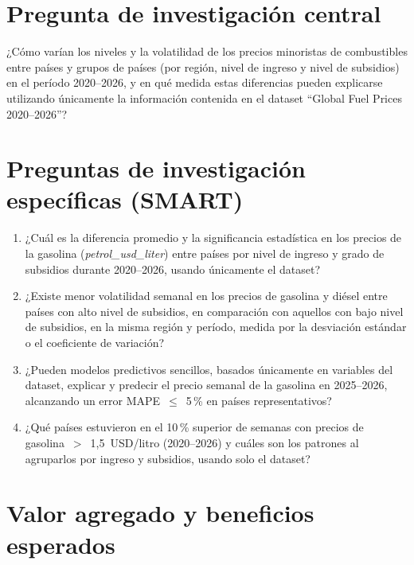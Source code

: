 \documentclass[stu, 12pt, a4paper, biblatex, donotrepeattitle]{apa7}
\begin{document}
\section{Pregunta de investigación central}

¿Cómo varían los niveles y la volatilidad de los precios minoristas de combustibles entre países y grupos de países (por región, nivel de ingreso y nivel de subsidios) en el período 2020--2026, y en qué medida estas diferencias pueden explicarse utilizando únicamente la información contenida en el dataset ``Global Fuel Prices 2020--2026''?

\section{Preguntas de investigación específicas (SMART)}

\begin{enumerate}
  \item ¿Cuál es la diferencia promedio y la significancia estadística en los precios de la gasolina (\textit{petrol\_usd\_liter}) entre países por nivel de ingreso y grado de subsidios durante 2020--2026, usando únicamente el dataset?

  \item ¿Existe menor volatilidad semanal en los precios de gasolina y diésel entre países con alto nivel de subsidios, en comparación con aquellos con bajo nivel de subsidios, en la misma región y período, medida por la desviación estándar o el coeficiente de variación?

  \item ¿Pueden modelos predictivos sencillos, basados únicamente en variables del dataset, explicar y predecir el precio semanal de la gasolina en 2025--2026, alcanzando un error MAPE~$\leq$~5\,\% en países representativos?

  \item ¿Qué países estuvieron en el 10\,\% superior de semanas con precios de gasolina~$>$~1{,}5~USD/litro (2020--2026) y cuáles son los patrones al agruparlos por ingreso y subsidios, usando solo el dataset?
\end{enumerate}

\section{Valor agregado y beneficios esperados}
\end{document}
